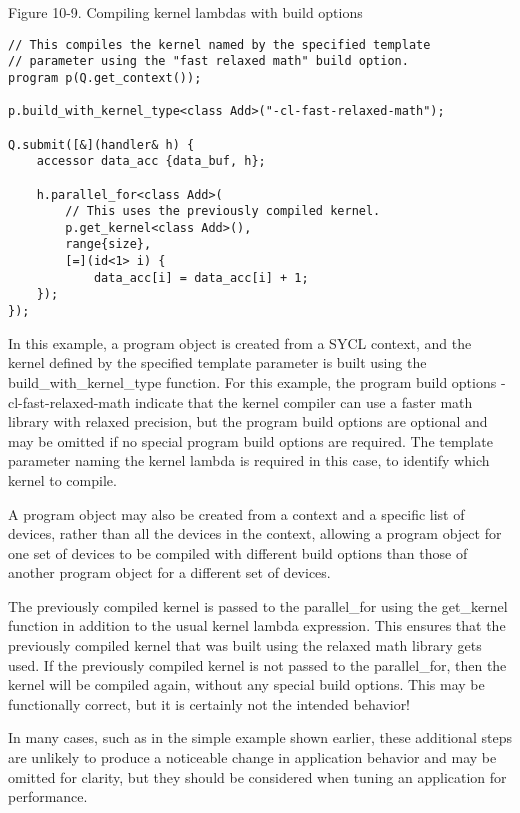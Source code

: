 \hspace*{\fill} \par %
Figure 10-9. Compiling kernel lambdas with build options
\begin{lstlisting}[caption={}]
// This compiles the kernel named by the specified template
// parameter using the "fast relaxed math" build option.
program p(Q.get_context());

p.build_with_kernel_type<class Add>("-cl-fast-relaxed-math");

Q.submit([&](handler& h) {
	accessor data_acc {data_buf, h};
	
	h.parallel_for<class Add>(
		// This uses the previously compiled kernel.
		p.get_kernel<class Add>(),
		range{size},
		[=](id<1> i) {
			data_acc[i] = data_acc[i] + 1;
	});
});
\end{lstlisting}

In this example, a program object is created from a SYCL context, and the kernel defined by the specified template parameter is built using the build\_with\_kernel\_type function. For this example, the program build options -cl-fast-relaxed-math indicate that the kernel compiler can use a faster math library with relaxed precision, but the program build options are optional and may be omitted if no special program build options are required. The template parameter naming the kernel lambda is required in this case, to identify which kernel to compile.\par

A program object may also be created from a context and a specific list of devices, rather than all the devices in the context, allowing a program object for one set of devices to be compiled with different build options than those of another program object for a different set of devices.\par

The previously compiled kernel is passed to the parallel\_for using the get\_kernel function in addition to the usual kernel lambda expression. This ensures that the previously compiled kernel that was built using the relaxed math library gets used. If the previously compiled kernel is not passed to the parallel\_for, then the kernel will be compiled again, without any special build options. This may be functionally correct, but it is certainly not the intended behavior!\par

In many cases, such as in the simple example shown earlier, these additional steps are unlikely to produce a noticeable change in application behavior and may be omitted for clarity, but they should be considered when tuning an application for performance.\par

